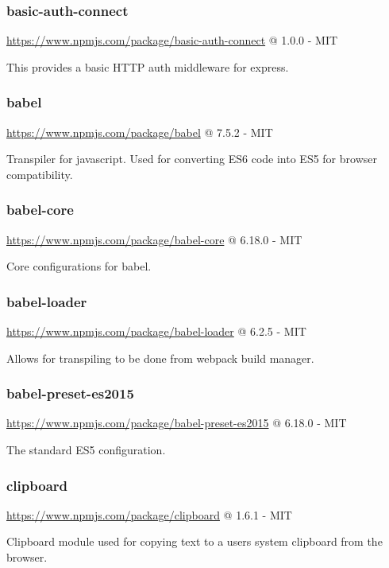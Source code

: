 \subsubsection*{basic-auth-connect} 

\url{https://www.npmjs.com/package/basic-auth-connect} @ 1.0.0 - MIT

This provides a basic HTTP auth middleware for express.

\subsubsection*{babel}

\url{https://www.npmjs.com/package/babel} @ 7.5.2 - MIT

Transpiler for javascript. Used for converting ES6 code into ES5 for browser compatibility.

\subsubsection*{babel-core}

\url{https://www.npmjs.com/package/babel-core} @ 6.18.0 - MIT

Core configurations for babel.


\subsubsection*{babel-loader}

\url{https://www.npmjs.com/package/babel-loader} @ 6.2.5 - MIT

Allows for transpiling to be done from webpack build manager.

\subsubsection*{babel-preset-es2015}

\url{https://www.npmjs.com/package/babel-preset-es2015} @ 6.18.0 - MIT

The standard ES5 configuration.

\subsubsection*{clipboard}

\url{https://www.npmjs.com/package/clipboard} @ 1.6.1 - MIT

Clipboard module used for copying text to a users system clipboard from the browser.


